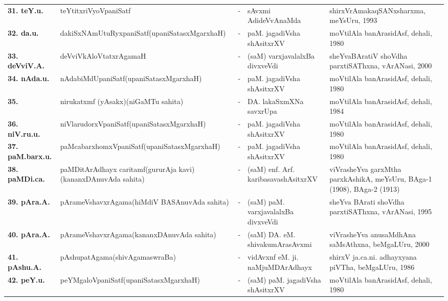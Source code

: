 {\begin{longtable}{lp{5cm}cp{5cm}<{\raggedright}p{3cm}<{\raggedright}@{}}
{\bf 31. teY.u.} & teYtitxriVyoVpaniSatf &-& sAvxmi AdideVvAnaMda & shirxVrAmakaqSANxsharxma, meYsUru, 1993\\
{\bf 32. da.u.} & dakiSxNAmUtuRyxpaniSatf\newline (upaniSatasxMgarxhaH) &-& paM. jagadiVsha shAsitxrXV & moVtilAla banArasidAsf, dehali, 1980\\
{\bf 33. deVviV.A.} & deVviVkAloVtatxrAgamaH &-& (saM) varxjavalalxBa divxveVdi & sheYvaBAratiV shoVdha parxtiSAThxna, vArANasi, 2000\\
{\bf 34. nAda.u.} & nAdabiMdUpaniSatf\newline (upaniSatasxMgarxhaH) &-& paM. jagadiVsha shAsitxrXV & moVtilAla banArasidAsf, dehali, 1980\\
{\bf 35. } & nirukatxmf (yAsakx)\newline (niGaMTu sahita) &-& DA. lakaSxmXNa savxrUpa & moVtilAla banArasidAsf, dehali, 1984\\
{\bf 36. niV.ru.u.} & niVlarudorxVpaniSatf\newline (upaniSatasxMgarxhaH) &-& paM. jagadiVsha shAsitxrXV & moVtilAla banArasidAsf, dehali, 1980\\
{\bf 37. paM.barx.u.} & paMcabarxhomxVpaniSatf\newline (upaniSatasxMgarxhaH) &-& paM. jagadiVsha shAsitxrXV & moVtilAla banArasidAsf, dehali, 1980\\
{\bf 38. paMDi.ca.} & paMDitArAdhayx caritamf\newline (gururAja kavi)\newline (kananxDAnuvAda sahita) &-& (saM) enf. Arf. karibasavashAsitxrXV & viVrasheYva garxMtha parxkAshikA, meYsUru, BAga-1 (1908), BAga-2 (1913)\\
{\bf 39. pAra.A.} & pArameVshavxrAgama\newline (hiMdiV BASAnuvAda sahita) &-& (saM) paM. varxjavalalxBa divxveVdi & sheYva BArati shoVdha parxtiSAThxna, vArANasi, 1995\\
{\bf 40. pAra.A.} & pArameVshavxrAgama\newline (kananxDAnuvAda sahita) &-& (saM) DA. eM. shivakumArasAvxmi & viVrasheYva anusaMdhAna saMsAthxna, beMgaLUru, 2000\\
{\bf 41. pAshu.A.} & pAshupatAgama\newline (shivAgamaswraBa) &-& vidAvxnf eM. ji. naMjuMDArAdhayx & shirxV ja.ca.ni. adhayxyana piVTha, beMgaLUru, 1986\\
{\bf 42. peY.u.} & peYMgaloVpaniSatf\newline (upaniSatasxMgarxhaH) &-& (saM) paM. jagadiVsha shAsitxrXV & moVtilAla banArasidAsf, dehali, 1980\\

\end{longtable}}
